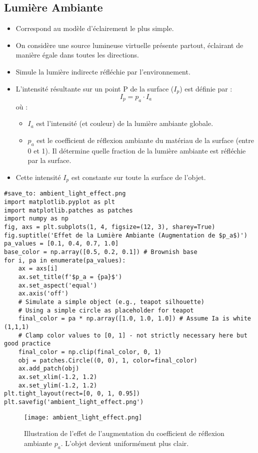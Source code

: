 \subsection{Lumière Ambiante}
\begin{itemize}
    \item Correspond au modèle d'éclairement le plus simple.
    \item On considère une source lumineuse virtuelle présente partout, éclairant de manière égale dans toutes les directions.
    \item Simule la lumière indirecte réfléchie par l'environnement.
    \item L'intensité résultante sur un point P de la surface (\(I_p\)) est définie par :
    \[ I_p = p_a \cdot I_a \]
    où :
        \begin{itemize}
            \item \(I_a\) est l'intensité (et couleur) de la lumière ambiante globale.
            \item \(p_a\) est le coefficient de réflexion ambiante du matériau de la surface (entre 0 et 1). Il détermine quelle fraction de la lumière ambiante est réfléchie par la surface.
        \end{itemize}
    \item Cette intensité \(I_p\) est constante sur toute la surface de l'objet.
\end{itemize}
\begin{verbatim}
#save_to: ambient_light_effect.png
import matplotlib.pyplot as plt
import matplotlib.patches as patches
import numpy as np
fig, axs = plt.subplots(1, 4, figsize=(12, 3), sharey=True)
fig.suptitle('Effet de la Lumière Ambiante (Augmentation de $p_a$)')
pa_values = [0.1, 0.4, 0.7, 1.0]
base_color = np.array([0.5, 0.2, 0.1]) # Brownish base
for i, pa in enumerate(pa_values):
    ax = axs[i]
    ax.set_title(f'$p_a = {pa}$')
    ax.set_aspect('equal')
    ax.axis('off')
    # Simulate a simple object (e.g., teapot silhouette)
    # Using a simple circle as placeholder for teapot
    final_color = pa * np.array([1.0, 1.0, 1.0]) # Assume Ia is white (1,1,1)
    # Clamp color values to [0, 1] - not strictly necessary here but good practice
    final_color = np.clip(final_color, 0, 1)
    obj = patches.Circle((0, 0), 1, color=final_color)
    ax.add_patch(obj)
    ax.set_xlim(-1.2, 1.2)
    ax.set_ylim(-1.2, 1.2)
plt.tight_layout(rect=[0, 0, 1, 0.95])
plt.savefig('ambient_light_effect.png')
\end{verbatim}
\begin{figure}[H]
\centering
\texttt{[image: ambient\_light\_effect.png]}
\caption{Illustration de l'effet de l'augmentation du coefficient de réflexion ambiante \(p_a\). L'objet devient uniformément plus clair.}
\label{fig:ambient_light_effect}
\end{figure}
